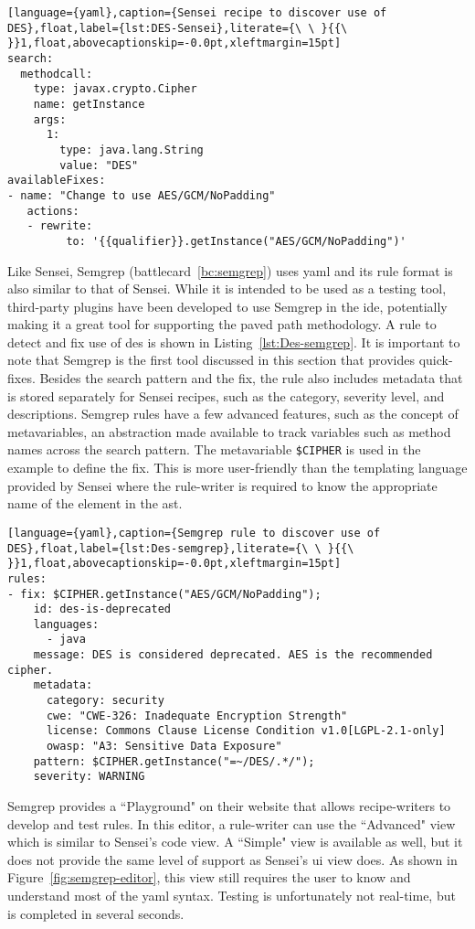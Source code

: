 \begin{lstlisting}[language={yaml},caption={Sensei recipe to discover use of DES},float,label={lst:DES-Sensei},literate={\ \ }{{\ }}1,float,abovecaptionskip=-0.0pt,xleftmargin=15pt]
search:
  methodcall:
    type: javax.crypto.Cipher
    name: getInstance
    args:
      1:
        type: java.lang.String
        value: "DES"
availableFixes:
- name: "Change to use AES/GCM/NoPadding"
   actions:
   - rewrite:
         to: '{{qualifier}}.getInstance("AES/GCM/NoPadding")'
\end{lstlisting}

Like Sensei, Semgrep (battlecard~\ref{bc:semgrep}) uses \gls{yaml} and its rule format is also similar to that of Sensei.
While it is intended to be used as a testing tool, third-party plugins have been developed to use Semgrep in the \gls{ide}, potentially making it a great tool for supporting the paved path methodology.
A rule to detect and fix use of \gls{des} is shown in Listing~\ref{lst:Des-semgrep}.
It is important to note that Semgrep is the first tool discussed in this section that provides quick-fixes.
Besides the search pattern and the fix, the rule also includes metadata that is stored separately for Sensei recipes, such as the category, severity level, and descriptions.
Semgrep rules have a few advanced features, such as the concept of metavariables, an abstraction made available to track variables such as method names across the search pattern.
The metavariable \texttt{\$CIPHER} is used in the example to define the fix.
This is more user-friendly than the templating language provided by Sensei where the rule-writer is required to know the appropriate name of the element in the \gls{ast}.

\begin{lstlisting}[language={yaml},caption={Semgrep rule to discover use of DES},float,label={lst:Des-semgrep},literate={\ \ }{{\ }}1,float,abovecaptionskip=-0.0pt,xleftmargin=15pt]
rules:
- fix: $CIPHER.getInstance("AES/GCM/NoPadding");
    id: des-is-deprecated
    languages:
      - java
    message: DES is considered deprecated. AES is the recommended cipher.
    metadata:
      category: security
      cwe: "CWE-326: Inadequate Encryption Strength"
      license: Commons Clause License Condition v1.0[LGPL-2.1-only]
      owasp: "A3: Sensitive Data Exposure"
    pattern: $CIPHER.getInstance("=~/DES/.*/");
    severity: WARNING
\end{lstlisting}

Semgrep provides a ``Playground" on their website that allows recipe-writers to develop and test rules.
In this editor, a rule-writer can use the ``Advanced" view which is similar to Sensei's code view.
A ``Simple" view is available as well, but it does not provide the same level of support as Sensei's \gls{ui} view does.
As shown in Figure~\ref{fig:semgrep-editor}, this view still requires the user to know and understand most of the \gls{yaml} syntax.
Testing is unfortunately not real-time, but is completed in several seconds.

